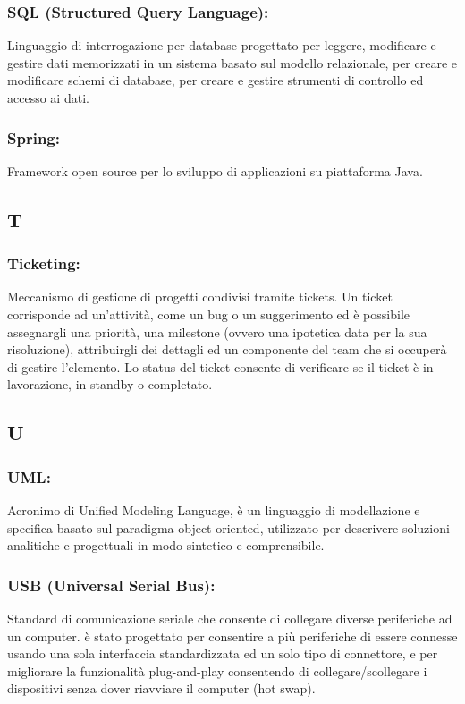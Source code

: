 \subsubsection*{SQL (Structured Query Language):} Linguaggio di
interrogazione per database progettato per leggere, modificare e gestire dati
memorizzati in un sistema basato sul modello relazionale, per creare e
modificare schemi di database, per creare e gestire strumenti di controllo ed
accesso ai dati.

\subsubsection*{Spring:} Framework open source per lo sviluppo di applicazioni
su piattaforma Java.

\subsection*{\huge{T}}
\subsubsection*{Ticketing:} Meccanismo di gestione di progetti condivisi tramite
tickets. Un ticket corrisponde ad un'attivit\`a, come un bug o un suggerimento
ed \`e possibile assegnargli una priorit\`a, una milestone (ovvero una ipotetica
data per la sua risoluzione), attribuirgli dei dettagli ed un componente del
team che si occuper\`a di gestire l'elemento. Lo status del ticket consente di
verificare se il ticket \`e in lavorazione, in standby o completato.

\subsection*{\huge{U}}
\subsubsection*{UML:} Acronimo di Unified Modeling Language, \`e un linguaggio
di modellazione e specifica basato sul paradigma object-oriented, utilizzato per
descrivere soluzioni analitiche e progettuali in modo sintetico e comprensibile.

\subsubsection*{USB (Universal Serial Bus):} Standard di comunicazione seriale
che consente di collegare diverse periferiche ad un computer. \`e stato progettato
per consentire a pi\`u periferiche di essere connesse usando una sola interfaccia
standardizzata ed un solo tipo di connettore, e per migliorare la funzionalit\`a
plug-and-play consentendo di collegare/scollegare i dispositivi senza dover
riavviare il computer (hot swap).

